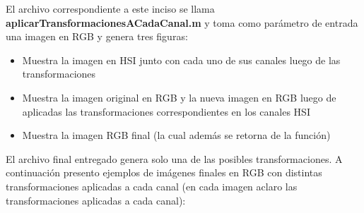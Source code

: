 \documentclass{article}
\begin{document}
El archivo correspondiente a este inciso se llama \textbf{aplicarTransformacionesACadaCanal.m} y toma como parámetro de entrada una imagen en RGB y genera tres figuras:
\begin{itemize}
\item Muestra la imagen en HSI junto con cada uno de sus canales luego de las transformaciones
\item Muestra la imagen original en RGB y la nueva imagen en RGB luego de aplicadas las transformaciones correspondientes en los canales HSI
\item Muestra la imagen RGB final (la cual además se retorna de la función)
\end{itemize} 

El archivo final entregado genera solo una de las posibles transformaciones. 
A continuación presento ejemplos de imágenes finales en RGB con distintas transformaciones aplicadas a cada canal (en cada imagen aclaro las transformaciones aplicadas a cada canal):
\end{document}
